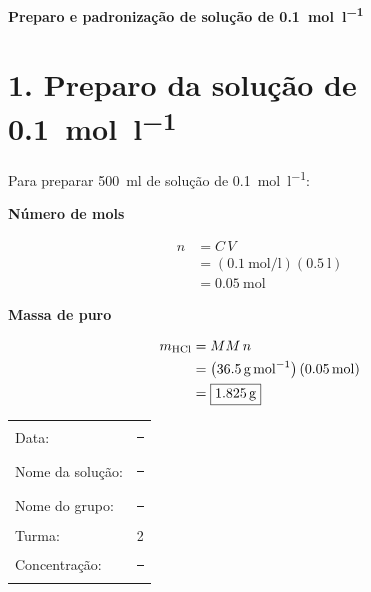 \documentclass[a4paper,12pt]{article}
\newcommand{\subtitulo}[1]{%
  \par\medskip
  {\color{quadroazul}\bfseries\large #1}\par\smallskip
}
\begin{document}
\begin{center}
  {\color{quadrovermelho}\bfseries\LARGE
  Preparo e padronização de solução de  \qty{0.1}{\mole\per\litre}}
\end{center}

\vspace{0.3cm}

\section*{1. Preparo da solução de  \qty{0.1}{\mole\per\litre}}

Para preparar \qty{500}{\milli\litre} de solução de 
\qty{0.1}{\mole\per\litre}:

\begin{minipage}[t]{0.48\textwidth}
\subtitulo{Número de mols}

\begin{align*}
  n &= C\,V \\
    &= \left(\qty{0.1}{\mole\per\litre}\right)
       \left(\qty{0.5}{\litre}\right) \\
    &= \boxed{\qty{0.05}{\mole}}
\end{align*}

\subtitulo{Massa de  puro}

\begin{align*}
  m_{\ce{HCl}} &= MM\,n \\
    &= \left(\qty{36.5}{\gram\per\mole}\right)
       \left(\qty{0.05}{\mole}\right) \\
    &= \boxed{\qty{1.825}{\gram}}
\end{align*}

\begin{tcolorbox}[
  title=Etiqueta,
  colback=quadrocinza,
  colframe=black!65,
  boxrule=0.6pt,
  arc=1mm
]
\begin{tabular}{@{}ll@{}}
Data: & \rule{4.3cm}{0.4pt}\\[1.3ex]
Nome da solução: & \rule{2.5cm}{0.4pt}\\[1.3ex]
Nome do grupo: & \rule{2.8cm}{0.4pt}\\[1.3ex]
Turma: & 2\\[1.3ex]
Concentração: & \rule{3.1cm}{0.4pt}
\end{tabular}
\end{tcolorbox}
\end{minipage}
\hfill
\end{document}
